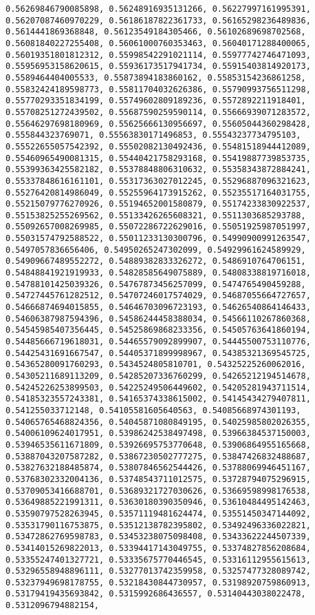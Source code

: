 \documentclass[11pt]{article}
\begin{document}
\begin{Verbatim}[commandchars=\\\{\}]
0.56269846790085898, 0.56248916935131266, 0.56227997161995391, 0.56207087460970229, 0.56186187822361733, 0.56165298236489836, 0.5614441869368848, 0.56123549184305466, 0.56102689698702568, 0.56081840227255408, 0.56061000760353463, 0.56040171288400065, 0.56019351801812312, 0.55998542291021114, 0.55977742746471093, 0.55956953158620615, 0.55936173517941734, 0.55915403814920173, 0.5589464404005533, 0.55873894183860162, 0.55853154236861258, 0.55832424189598773, 0.55811704032626386, 0.55790993756511298, 0.55770293351834199, 0.55749602809189236, 0.5572892211918401, 0.55708251272439502, 0.55687590259590114, 0.55666939071283572, 0.55646297698180969, 0.55625666130956697, 0.55605044360298428, 0.555844323769071, 0.55563830171496853, 0.55543237734795103, 0.55522655057542392, 0.55502082130492436, 0.55481518944412089, 0.55460965490081315, 0.55440421758293168, 0.55419887739853735, 0.55399363425582182, 0.55378848806310632, 0.55358343872884241, 0.55337848616161101, 0.55317363027012245, 0.55296887096321623, 0.55276420814986049, 0.55255964173915262, 0.55235517164031755, 0.55215079776270926, 0.55194652001580879, 0.55174233830922537, 0.55153825255269562, 0.55133426265608321, 0.5511303685293788, 0.55092657008269985, 0.55072286722629016, 0.55051925987051997, 0.55031574792588522, 0.55011233130300796, 0.54990900991263547, 0.5497057836656406, 0.54950265247302099, 0.54929961624589929, 0.54909667489552272, 0.54889382833326272, 0.5486910764706151, 0.54848841921919933, 0.54828585649075889, 0.54808338819716018, 0.54788101425039326, 0.54767873456257099, 0.5474765490459288, 0.54727445761282512, 0.54707246017574029, 0.54687055664727657, 0.54666874694015855, 0.54646703096723193, 0.54626540864146433, 0.54606387987594396, 0.54586244458388034, 0.54566110267860368, 0.54545985407356445, 0.54525869868233356, 0.54505763641860194, 0.54485666719618031, 0.54465579092899907, 0.54445500753110776, 0.54425431691667547, 0.54405371899998967, 0.54385321369545725, 0.54365280091760293, 0.5434524805810701, 0.54325225260062016, 0.54305211689113209, 0.54285207336760299, 0.54265212194514678, 0.54245226253899503, 0.54225249506449602, 0.54205281943711514, 0.54185323557243381, 0.54165374338615002, 0.54145434279407811, 0.541255033712148, 0.54105581605640563, 0.54085668974301193, 0.54065765468824356, 0.54045871080849195, 0.54025985802026355, 0.54006109624017951, 0.53986242538497498, 0.53966384537150003, 0.53946535611671809, 0.53926695753770648, 0.53906864955165668, 0.53887043207587282, 0.53867230502777275, 0.53847426832488687, 0.53827632188485874, 0.53807846562544426, 0.53788069946451167, 0.53768302332004136, 0.53748543711012575, 0.53728794075296915, 0.53709053416688701, 0.53689321727030626, 0.53669598998176538, 0.53649885221991311, 0.53630180390350946, 0.53610484495142463, 0.53590797528263945, 0.53571119481624474, 0.53551450347144092, 0.53531790116753875, 0.53512138782395802, 0.53492496336022821, 0.53472862769598783, 0.53453238075098408, 0.53433622244507339, 0.53414015269822013, 0.53394417143049755, 0.53374827856208684, 0.53355247401327721, 0.53335675770446545, 0.53316112955615613, 0.53296558948896111, 0.53277013742359958, 0.53257477328089742, 0.53237949698178755, 0.53218430844730957, 0.53198920759860913, 0.53179419435693842, 0.5315992686436557, 0.53140443038022478, 0.5312096794882154, 
\end{Verbatim}
\end{document}
